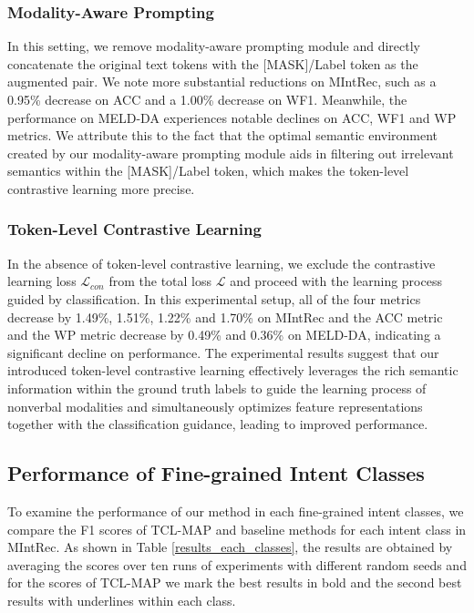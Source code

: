 \documentclass[letterpaper]{article}
\begin{document}
\subsubsection{Modality-Aware Prompting}
In this setting, we remove modality-aware prompting module and directly concatenate the original text tokens with the [MASK]/Label token as the augmented pair. We note more substantial reductions on MIntRec, such as a 0.95\% decrease on ACC and a 1.00\% decrease on WF1. Meanwhile, the performance on MELD-DA experiences notable declines on ACC, WF1 and WP metrics. We attribute this to the fact that the optimal semantic environment created by our modality-aware prompting module aids in filtering out irrelevant semantics within the [MASK]/Label token, which makes the token-level contrastive learning more precise.


\subsubsection{Token-Level Contrastive Learning}
In the absence of token-level contrastive learning, we exclude the contrastive learning loss $\mathcal{L}_{con}$ from the total loss $\mathcal{L}$ and proceed with the learning process guided by classification. In this experimental setup, all of the four metrics decrease by 1.49\%, 1.51\%, 1.22\% and 1.70\% on MIntRec and the ACC metric and the WP metric decrease by 0.49\% and 0.36\% on MELD-DA, indicating a significant decline on performance. The experimental results suggest that our introduced token-level contrastive learning effectively leverages the rich semantic information within the ground truth labels to guide the learning process of nonverbal modalities and simultaneously optimizes feature representations together with the classification guidance, leading to improved performance.

\subsection{Performance of Fine-grained Intent Classes}
To examine the performance of our method in each fine-grained intent classes, we compare the F1 scores of TCL-MAP and baseline methods for each intent class in MIntRec. As shown in Table \ref{results_each_classes}, the results are obtained by averaging the scores over ten runs of experiments with different random seeds and for the scores of TCL-MAP we mark the best results in bold and the second best results with underlines within each class.
\end{document}
